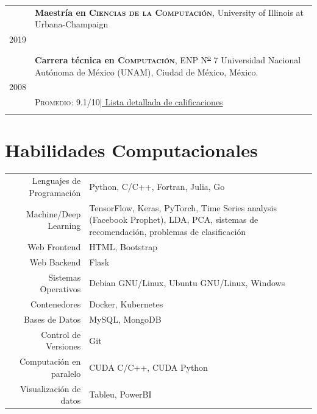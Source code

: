 \documentclass[a4paper,10pt]{article} %
\begin{document}
\begin{tabular}{r|p{14cm}}

	\textsc{2010} & \textbf{Carrera técnica en \textsc{\large{Computación}}}, ENP N\textsuperscript{\underline{o}} 7 Universidad Nacional Autónoma de México (UNAM), \small Ciudad de México, México.\\
	\textsc{2008}& \\
	&\normalsize \textsc{Promedio}: 9.1/10\hyperlink{grdstechcarr}{\hfill | \footnotesize Lista detallada de calificaciones}\\
	\multicolumn{2}{c}{}\\
	
\end{tabular}

\section{Habilidades Computacionales}

\begin{tabular}{r|p{10.5cm}}
	Lenguajes de Programación & Python, C/C++, Fortran, Julia, Go \\
	Machine/Deep Learning &  TensorFlow, Keras, PyTorch, Time Series analysis (Facebook Prophet), LDA, PCA, sistemas de recomendación, problemas de clasificación\\
	Web Frontend & HTML, Bootstrap \\
	Web Backend & Flask \\
	Sistemas Operativos & Debian GNU/Linux, Ubuntu GNU/Linux, Windows \\
	Contenedores & Docker, Kubernetes \\
	Bases de Datos& MySQL, MongoDB \\
	Control de Versiones & Git \\
	Computación en paralelo & CUDA C/C++, CUDA Python\\
	Visualización de datos & Tableu, PowerBI

\end{tabular}
\end{document}
